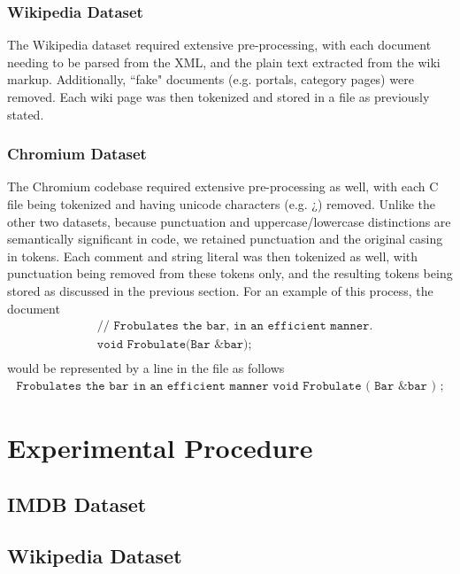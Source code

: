 \documentclass[11pt]{article}
\newcommand{\CPP}
{C\nolinebreak[4]\hspace{-.05em}\raisebox{.22ex}{\footnotesize\bf ++\ }}
\begin{document}
\subsubsection*{Wikipedia Dataset}
The Wikipedia dataset required extensive pre-processing, with each document
needing to be parsed from the XML, and the plain text extracted from the wiki
markup. Additionally, ``fake" documents (e.g. portals, category pages) were
removed. Each wiki page was then tokenized and stored in a file as previously
stated.

\subsubsection*{Chromium Dataset}
The Chromium codebase required extensive pre-processing as well, with each \CPP
file being tokenized and having unicode characters (e.g. ¿) removed.
Unlike the other two datasets, because punctuation and uppercase/lowercase
distinctions are semantically significant in code, we retained punctuation and
the original casing in tokens.
Each comment and string literal was then tokenized as well, with punctuation
being removed from these tokens only, and the resulting tokens being stored as
discussed in the previous section. For an example of this process, the
document
\begin{align*}
&\texttt{// Frobulates the bar, in an efficient manner.}\\
&\texttt{void Frobulate(Bar \&bar);}\\
\end{align*}
would be represented by a line in the file as follows\\
\begin{align*}
\texttt{Frobulates the bar in an efficient manner void Frobulate ( Bar \& bar ) ;}
\end{align*}

\section*{Experimental Procedure}

\subsection*{IMDB Dataset}

\subsection*{Wikipedia Dataset}
\end{document}

